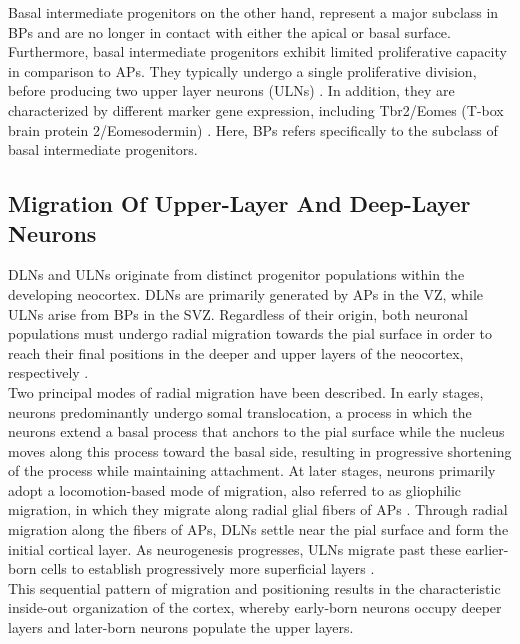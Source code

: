 Basal intermediate progenitors on the other hand, represent a major subclass in BPs and are no longer in contact with either the apical or basal surface. Furthermore, basal intermediate progenitors exhibit limited proliferative capacity in comparison to APs. They typically undergo a single proliferative division, before producing two upper layer neurons (\glspl{ULN}) \citep{THORIndirectNeurogenesisSpace2024}. 
In addition, they are characterized by different marker gene expression, including Tbr2/Eomes (T-box brain protein 2/Eomesodermin) \citep{ENGLUNDPax6Tbr2Tbr12005}. Here, BPs refers specifically to the subclass of basal intermediate progenitors. 

\subsection{Migration Of Upper-Layer And Deep-Layer Neurons}

DLNs and ULNs originate from distinct progenitor populations within the developing neocortex. DLNs are primarily generated by APs in the VZ, while ULNs arise from BPs in the SVZ. Regardless of their origin, both neuronal populations must undergo radial migration towards the pial surface in order to reach their final positions in the deeper and upper layers of the neocortex, respectively \citep{NADARAJAHModesNeuronalMigration2002}.
\\

Two principal modes of radial migration have been described. In early stages, neurons predominantly undergo somal translocation, a process in which the neurons extend a basal process that anchors to the pial surface while the nucleus moves along this process toward the basal side, resulting in progressive shortening of the process while maintaining attachment. At later stages, neurons primarily adopt a locomotion-based mode of migration, also referred to as gliophilic migration, in which they migrate along radial glial fibers of APs \citep{NADARAJAHModesNeuronalMigration2002}.
Through radial migration along the fibers of APs, DLNs settle near the pial surface and form the initial cortical layer. As neurogenesis progresses, ULNs migrate past these earlier-born cells to establish progressively more superficial layers \citep{BUCHSBAUMNeuronalMigrationCNS2019}.
\\

This sequential pattern of migration and positioning results in the characteristic inside-out organization of the cortex, whereby early-born neurons occupy deeper layers and later-born neurons populate the upper layers.

